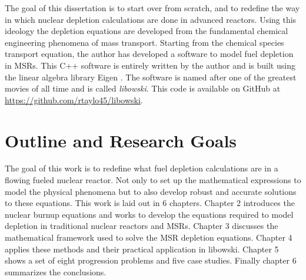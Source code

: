 The goal of this dissertation is to start over from scratch, and to redefine the way in which nuclear depletion calculations are done in advanced reactors. Using this ideology the depletion equations are developed from the fundamental chemical engineering phenomena of mass transport. Starting from the chemical species transport equation, the author has developed a software to model fuel depletion in MSRs. This C++ software is entirely written by the author and is built using the linear algebra library Eigen \cite{eigen}. The software is named after one of the greatest movies of all time and is called \textit{libowski}. This code is available on GitHub at \href{https://github.com/rtaylo45/libowski}{{\color{blue}https://github.com/rtaylo45/libowski}}.

\section{Outline and Research Goals}

The goal of this work is to redefine what fuel depletion calculations are in a flowing fueled nuclear reactor. Not only to set up the mathematical expressions to model the physical phenomena but to also develop robust and accurate solutions to these equations. This work is laid out in 6 chapters. Chapter 2 introduces the nuclear burnup equations and works to develop the equations required to model depletion in traditional nuclear reactors and MSRs. Chapter 3 discusses the mathematical framework used to solve the MSR depletion equations. Chapter 4 applies these methods  and their practical application in libowski. Chapter 5 shows a set of eight progression problems and five case studies. Finally chapter 6 summarizes the conclusions. 
